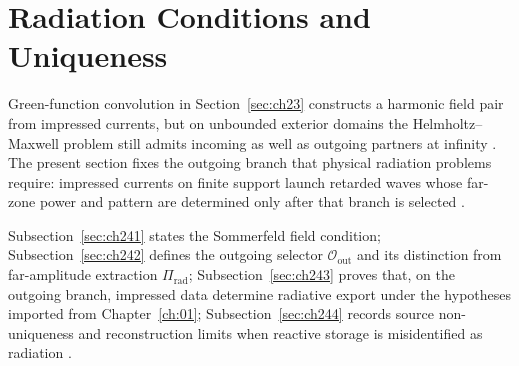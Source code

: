 \section{Radiation Conditions and Uniqueness}
\label{sec:ch24}

Green-function convolution in Section~\ref{sec:ch23} constructs a harmonic field pair from impressed currents, but on unbounded exterior domains the Helmholtz--Maxwell problem still admits incoming as well as outgoing partners at infinity \cite{jackson1999,sommerfeld1949}. The present section fixes the outgoing branch that physical radiation problems require: impressed currents on finite support launch retarded waves whose far-zone power and pattern are determined only after that branch is selected \cite{stratton1941}.

Subsection~\ref{sec:ch241} states the Sommerfeld field condition; Subsection~\ref{sec:ch242} defines the outgoing selector $\mathcal{O}_{\mathrm{out}}$ and its distinction from far-amplitude extraction $\Pi_{\mathrm{rad}}$; Subsection~\ref{sec:ch243} proves that, on the outgoing branch, impressed data determine radiative export under the hypotheses imported from Chapter~\ref{ch:01}; Subsection~\ref{sec:ch244} records source non-uniqueness and reconstruction limits when reactive storage is misidentified as radiation \cite{devaney2004,harrington2001}.